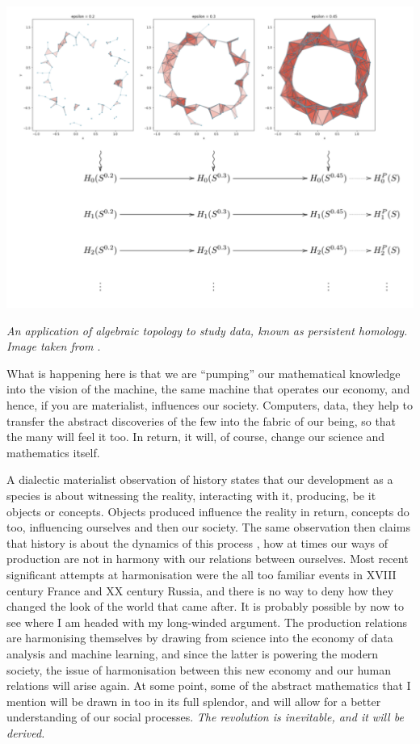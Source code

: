 \documentclass{article}
\begin{document}
\begin{center}
\includegraphics[scale=0.52]{noisy_circle_simplexes_and_persistent_homology.png}

\textit{An application of algebraic topology to study data, known as persistent homology. Image taken from \cite{BUNCH}}.
\end{center}


What is happening here is that we are “pumping” our mathematical knowledge into the vision of the machine, the same machine that operates our economy, and hence, if you are materialist, influences our society. Computers, data, they help to transfer the abstract discoveries of the few into the fabric of our being, so that the many will feel it too. In return, it will, of course, change our science and mathematics itself.

A dialectic materialist observation of history states that our development as a species is about witnessing the reality, interacting with it, producing, be it objects or concepts. Objects produced influence the reality in return, concepts do too, influencing ourselves and then our society. The same observation then claims that history is about the dynamics of this process  \cite{MARX,MARXENGCPE}, how at times our ways of production are not in harmony with our relations between ourselves. Most recent significant attempts at harmonisation were the all too familiar events in XVIII century France and XX century Russia, and there is no way to deny how they changed the look of the world that came after. It is probably possible by now to see where I am headed with my long-winded argument. The production relations are harmonising themselves by drawing from science into the economy of data analysis and machine learning, and since the latter is powering the modern society, the issue of harmonisation between this new economy and our human relations will arise again. At some point, some of the abstract mathematics that I mention will be drawn in too in its full splendor, and will allow for a better understanding of our social processes. \emph{The revolution is inevitable, and it will be derived.}
\end{document}
